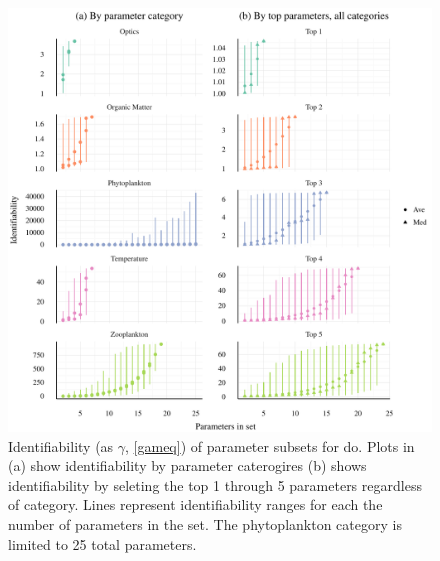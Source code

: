 \documentclass[letterpaper,12pt,oneside]{article}\usepackage[]{graphicx}\usepackage[]{color}
\makeatletter
\def\maxwidth{ %
  \ifdim\Gin@nat@width>\linewidth
    \linewidth
  \else
    \Gin@nat@width
  \fi
}
\makeatother
\begin{document}
\begin{figure}[!ht]

{\centering \includegraphics[width=\maxwidth]{figs/identbox-1} 

}

\caption[Identifiability (as ]{Identifiability (as $\gamma$, \cref{gameq}) of parameter subsets for \ac{do}.  Plots in (a) show identifiability by parameter caterogires (b) shows identifiability by seleting the top 1 through 5 parameters regardless of category.  Lines represent identifiability ranges for each the number of parameters in the set.  The phytoplankton category is limited to 25 total parameters.}\label{fig:identbox}
\end{figure}



\clearpage
\end{document}
